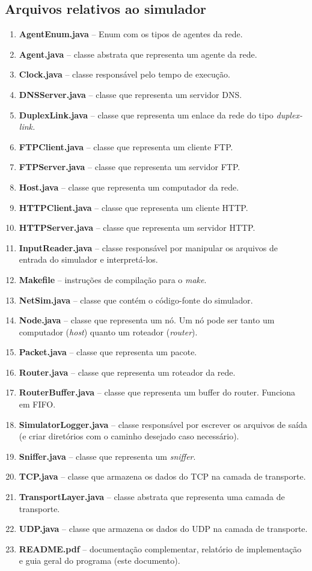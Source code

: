 \documentclass[11pt]{article}
\begin{document}
\subsection{Arquivos relativos ao simulador}
\begin{enumerate}

\item \textbf{AgentEnum.java} -- Enum com os tipos de agentes da rede.
\item \textbf{Agent.java} -- classe abstrata que representa um agente da rede.
\item \textbf{Clock.java} -- classe responsável pelo tempo de execução. 
\item \textbf{DNSServer.java} -- classe que representa um servidor DNS.
\item \textbf{DuplexLink.java} -- classe que representa um enlace da rede do tipo \textit{duplex-link.}
\item \textbf{FTPClient.java} -- classe que representa um cliente FTP.
\item \textbf{FTPServer.java} -- classe que representa um servidor FTP.
\item \textbf{Host.java} -- classe que representa um computador da rede.
\item \textbf{HTTPClient.java} -- classe que representa um cliente HTTP.
\item \textbf{HTTPServer.java} -- classe que representa um servidor HTTP.
\item \textbf{InputReader.java} -- classe responsável por manipular os arquivos de
entrada do simulador e interpretá-los.
\item \textbf{Makefile} -- instruções de compilação para o \textit{make}.
\item \textbf{NetSim.java} -- classe que contém o código-fonte do simulador.
\item \textbf{Node.java} -- classe que representa um nó. Um nó pode ser tanto
um computador (\textit{host}) quanto um roteador (\textit{router}).
\item \textbf{Packet.java} -- classe que representa um pacote.
\item \textbf{Router.java} -- classe que representa um roteador da rede.
\item \textbf{RouterBuffer.java} -- classe que representa um buffer do router. Funciona em FIFO.
\item \textbf{SimulatorLogger.java} -- classe responsável por escrever os arquivos de saída (e criar diretórios com o caminho desejado caso necessário).
\item \textbf{Sniffer.java} -- classe que representa um \textit{sniffer}.
\item \textbf{TCP.java} -- classe que armazena os dados do TCP na camada de transporte.
\item \textbf{TransportLayer.java} -- classe abstrata que representa uma camada de transporte.
\item \textbf{UDP.java} -- classe que armazena os dados do UDP na camada de transporte.
\item \textbf{README.pdf} -- documentação complementar, relatório de implementação e guia geral do programa (este documento).
\end{enumerate}
\end{document}
